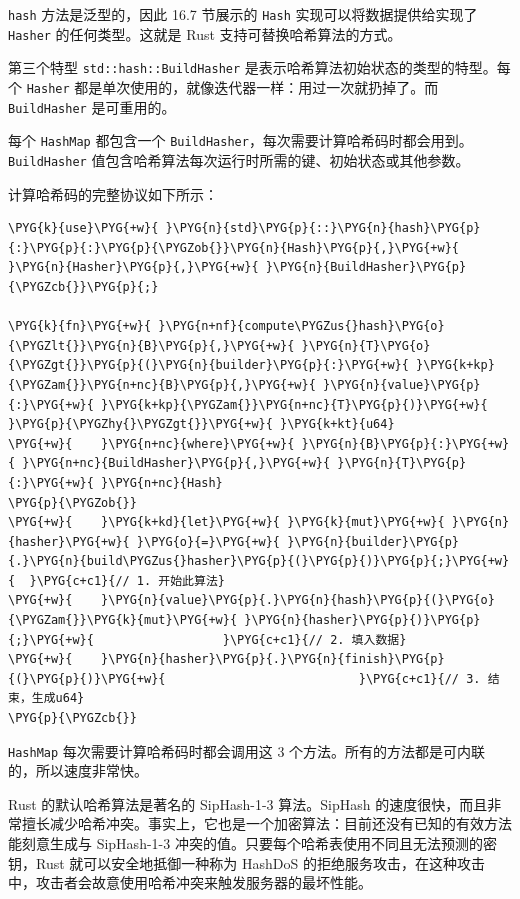 \texttt{hash} 方法是泛型的，因此 16.7 节展示的 \texttt{Hash} 实现可以将数据提供给实现了 \texttt{Hasher} 的任何类型。这就是 Rust 支持可替换哈希算法的方式。

第三个特型 \texttt{std::hash::BuildHasher} 是表示哈希算法初始状态的类型的特型。每个 \texttt{Hasher} 都是单次使用的，就像迭代器一样：用过一次就扔掉了。而 \texttt{BuildHasher} 是可重用的。

每个 \texttt{HashMap} 都包含一个 \texttt{BuildHasher}，每次需要计算哈希码时都会用到。\texttt{BuildHasher} 值包含哈希算法每次运行时所需的键、初始状态或其他参数。

计算哈希码的完整协议如下所示：

\begin{Verbatim}[commandchars=\\\{\},breaklines=true,breakanywhere=true,fontsize=\codefont,xleftmargin=17bp]
\PYG{k}{use}\PYG{+w}{ }\PYG{n}{std}\PYG{p}{::}\PYG{n}{hash}\PYG{p}{:}\PYG{p}{:}\PYG{p}{\PYGZob{}}\PYG{n}{Hash}\PYG{p}{,}\PYG{+w}{ }\PYG{n}{Hasher}\PYG{p}{,}\PYG{+w}{ }\PYG{n}{BuildHasher}\PYG{p}{\PYGZcb{}}\PYG{p}{;}

\PYG{k}{fn}\PYG{+w}{ }\PYG{n+nf}{compute\PYGZus{}hash}\PYG{o}{\PYGZlt{}}\PYG{n}{B}\PYG{p}{,}\PYG{+w}{ }\PYG{n}{T}\PYG{o}{\PYGZgt{}}\PYG{p}{(}\PYG{n}{builder}\PYG{p}{:}\PYG{+w}{ }\PYG{k+kp}{\PYGZam{}}\PYG{n+nc}{B}\PYG{p}{,}\PYG{+w}{ }\PYG{n}{value}\PYG{p}{:}\PYG{+w}{ }\PYG{k+kp}{\PYGZam{}}\PYG{n+nc}{T}\PYG{p}{)}\PYG{+w}{ }\PYG{p}{\PYGZhy{}\PYGZgt{}}\PYG{+w}{ }\PYG{k+kt}{u64}
\PYG{+w}{    }\PYG{n+nc}{where}\PYG{+w}{ }\PYG{n}{B}\PYG{p}{:}\PYG{+w}{ }\PYG{n+nc}{BuildHasher}\PYG{p}{,}\PYG{+w}{ }\PYG{n}{T}\PYG{p}{:}\PYG{+w}{ }\PYG{n+nc}{Hash}
\PYG{p}{\PYGZob{}}
\PYG{+w}{    }\PYG{k+kd}{let}\PYG{+w}{ }\PYG{k}{mut}\PYG{+w}{ }\PYG{n}{hasher}\PYG{+w}{ }\PYG{o}{=}\PYG{+w}{ }\PYG{n}{builder}\PYG{p}{.}\PYG{n}{build\PYGZus{}hasher}\PYG{p}{(}\PYG{p}{)}\PYG{p}{;}\PYG{+w}{  }\PYG{c+c1}{// 1. 开始此算法}
\PYG{+w}{    }\PYG{n}{value}\PYG{p}{.}\PYG{n}{hash}\PYG{p}{(}\PYG{o}{\PYGZam{}}\PYG{k}{mut}\PYG{+w}{ }\PYG{n}{hasher}\PYG{p}{)}\PYG{p}{;}\PYG{+w}{                  }\PYG{c+c1}{// 2. 填入数据}
\PYG{+w}{    }\PYG{n}{hasher}\PYG{p}{.}\PYG{n}{finish}\PYG{p}{(}\PYG{p}{)}\PYG{+w}{                           }\PYG{c+c1}{// 3. 结束，生成u64}
\PYG{p}{\PYGZcb{}}
\end{Verbatim}

\texttt{HashMap} 每次需要计算哈希码时都会调用这 3 个方法。所有的方法都是可内联的，所以速度非常快。

Rust 的默认哈希算法是著名的 SipHash-1-3 算法。SipHash 的速度很快，而且非常擅长减少哈希冲突。事实上，它也是一个加密算法：目前还没有已知的有效方法能刻意生成与 SipHash-1-3 冲突的值。只要每个哈希表使用不同且无法预测的密钥，Rust 就可以安全地抵御一种称为 HashDoS 的拒绝服务攻击，在这种攻击中，攻击者会故意使用哈希冲突来触发服务器的最坏性能。

